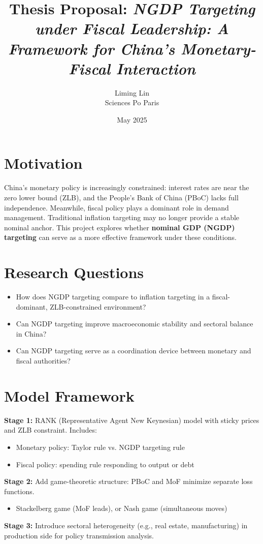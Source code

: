 \documentclass[12pt]{article}
\title{Thesis Proposal: \textit{NGDP Targeting under Fiscal Leadership: A Framework for China's Monetary-Fiscal Interaction}}
\author{Liming Lin \\ Sciences Po Paris}
\date{May 2025}
\begin{document}
\maketitle
\onehalfspacing

\section*{Motivation}
China's monetary policy is increasingly constrained: interest rates are near the zero lower bound (ZLB), and the People's Bank of China (PBoC) lacks full independence. Meanwhile, fiscal policy plays a dominant role in demand management. Traditional inflation targeting may no longer provide a stable nominal anchor. This project explores whether \textbf{nominal GDP (NGDP) targeting} can serve as a more effective framework under these conditions.

\section*{Research Questions}
\begin{itemize}[noitemsep]
  \item How does NGDP targeting compare to inflation targeting in a fiscal-dominant, ZLB-constrained environment?
  \item Can NGDP targeting improve macroeconomic stability and sectoral balance in China?
  \item Can NGDP targeting serve as a coordination device between monetary and fiscal authorities?
\end{itemize}

\section*{Model Framework}
\textbf{Stage 1:} RANK (Representative Agent New Keynesian) model with sticky prices and ZLB constraint. Includes:
\begin{itemize}[noitemsep]
  \item Monetary policy: Taylor rule vs. NGDP targeting rule
  \item Fiscal policy: spending rule responding to output or debt
\end{itemize}
\textbf{Stage 2:} Add game-theoretic structure: PBoC and MoF minimize separate loss functions.
\begin{itemize}[noitemsep]
  \item Stackelberg game (MoF leads), or Nash game (simultaneous moves)
\end{itemize}
\textbf{Stage 3:} Introduce sectoral heterogeneity (e.g., real estate, manufacturing) in production side for policy transmission analysis.
\end{document}
